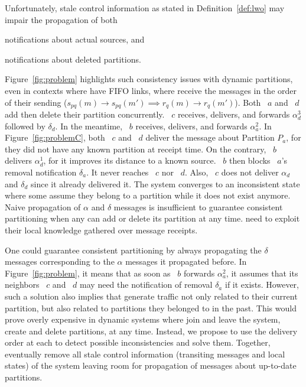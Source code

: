 Unfortunately, stale control information as stated in
Definition~\ref{def:lwo} may impair the propagation of both
\begin{inparaenum}[(i)]
\item notifications about actual sources, and
\item notifications about deleted partitions.
\end{inparaenum}
Figure~\ref{fig:problem} highlights such consistency issues with
dynamic partitions, even in contexts where \processes have FIFO links,
\ie where \processes receive the messages in the order of their
sending ($s_{pq}(m) \rightarrow s_{pq}(m') \implies r_q(m) \rightarrow
r_q(m')$). Both \Process~$a$ and \Process~$d$ add then delete their
partition concurrently. \Process~$c$ receives, delivers, and forwards
$\alpha_d^3$ followed by $\delta_d$. In the meantime, \Process~$b$
receives, delivers, and forwards $\alpha_a^2$. In
Figure~\ref{fig:problemC}, both \Process~$c$ and \Process~$d$ deliver
the message about Partition $P_a$, for they did not have any known
partition at receipt time. On the contrary, \Process~$b$ delivers
$\alpha_d^1$, for it improves its distance to a known
source. \Process~$b$ then blocks \Process~$a$'s removal notification
$\delta_a$. It never reaches \Process~$c$ nor \Process~$d$. Also,
\Process~$c$ does not deliver $\alpha_d$ and $\delta_d$ since it
already delivered it. The system converges to an inconsistent state
where some \processes assume they belong to a partition while it does
not exist anymore. Naive propagation of $\alpha$ and $\delta$ messages
is insufficient to guarantee consistent partitioning when any \process
can add or delete its partition at any time. \Processes need to
exploit their local knowledge gathered over message receipts.


One could guarantee consistent partitioning by always propagating the
$\delta$ messages corresponding to the $\alpha$ messages it propagated
before. In Figure~\ref{fig:problem}, it means that as soon as
\Process~$b$ forwards $\alpha_a^2$, it assumes that its neighbors
\Process~$c$ and \Process~$d$ may need the notification of removal
$\delta_a$ if it exists. However, such a solution also implies that
\processes generate traffic not only related to their current
partition, but also related to partitions they belonged to in the
past. This would prove overly expensive in dynamic systems where
\processes join and leave the system, create and delete partitions, at
any time.  Instead, we propose to use the delivery order at each
\process to detect possible inconsistencies and solve them. Together,
\processes eventually remove all stale control information (transiting
messages and local states) of the system leaving room for propagation
of messages about up-to-date partitions.

